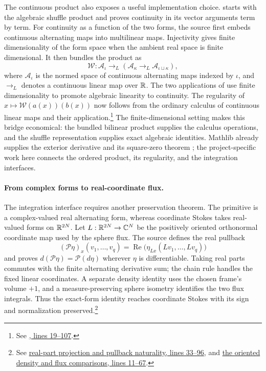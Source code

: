 The continuous product also exposes a useful implementation choice.
 starts with the algebraic shuffle product and proves
continuity in its vector arguments term by term. For continuity as a
function of the two forms, the source first embeds continuous alternating
maps into multilinear maps. Injectivity gives finite dimensionality of
the form space when the ambient real space is finite dimensional.
It then bundles the product as
\[
 \mathcal W:\mathcal A_\iota\longrightarrow_L
       (\mathcal A_\kappa\longrightarrow_L\mathcal A_{\iota\sqcup\kappa}),
\]
where $\mathcal A_\iota$ is the normed space of continuous alternating
maps indexed by $\iota$, and $\longrightarrow_L$ denotes a continuous
linear map over $\mathbb R$. The two applications of
 use finite dimensionality to promote
algebraic linearity to continuity. The regularity of
$x\mapsto\mathcal W(a(x))(b(x))$ now follows from the ordinary calculus
of continuous linear maps and their application.\footnote{See
\href{https://github.com/openai/math/blob/fd4aeeb2ee4fc729c18d98444fed42fd0529eeeb/lean/OAI/Analysis/Mahler/ContinuousWedge.lean\#L19-L107}{, lines 19--107}.}
The finite-dimensional setting makes this bridge economical: the bundled bilinear product supplies the calculus operations, and the shuffle representation supplies exact algebraic identities. Mathlib
already supplies the exterior derivative and its square-zero theorem
\citep{MathlibForms}; the project-specific work here connects the ordered
product, its regularity, and the integration interfaces.

\paragraph{From complex forms to real-coordinate flux.}
The integration interface requires another preservation theorem. The primitive is a complex-valued real alternating form, whereas coordinate Stokes takes real-valued forms on $\mathbb R^{2N}$. Let $L:\mathbb R^{2N}\to\mathbb C^N$ be the positively oriented orthonormal coordinate map used by the sphere flux. The source defines the real pullback
\[
 (\mathcal P\eta)_x(v_1,\ldots,v_q)
   =\operatorname{Re}\bigl(\eta_{Lx}(Lv_1,\ldots,Lv_q)\bigr)
\]
and proves $d(\mathcal P\eta)=\mathcal P(d\eta)$ wherever $\eta$ is differentiable. Taking real parts commutes with the finite alternating derivative sum; the chain rule handles the fixed linear coordinates. A separate density identity uses the chosen frame's volume $+1$, and a measure-preserving sphere isometry identifies the two flux integrals. Thus the exact-form identity reaches coordinate Stokes with its sign and normalization preserved.\footnote{See
\href{https://github.com/openai/math/blob/fd4aeeb2ee4fc729c18d98444fed42fd0529eeeb/lean/OAI/Analysis/Mahler/ExactFormCoordinates.lean\#L33-L96}{real-part projection and pullback naturality, lines 33--96}, and
\href{https://github.com/openai/math/blob/fd4aeeb2ee4fc729c18d98444fed42fd0529eeeb/lean/OAI/Analysis/Mahler/ExactSphereFluxBridge.lean\#L11-L67}{the oriented density and flux comparisons, lines 11--67}.}

